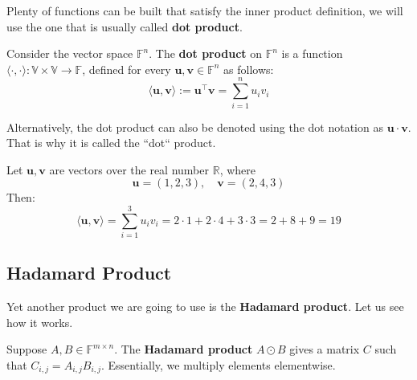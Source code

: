 \documentclass[../lecture-notes-148x210.tex]{subfiles}
\begin{document}
Plenty of functions can be built that satisfy the inner product definition, we will use the one that
is usually called \textbf{dot product}.
\begin{definition}
    Consider the vector space $\mathbb{F}^n$. The \textbf{dot product} on $\mathbb{F}^n$ is a function $\langle \cdot, \cdot \rangle: \mathbb{V} \times \mathbb{V} \rightarrow \mathbb{F}$, 
    defined for every $\mathbf{u}, \mathbf{v} \in \mathbb{F}^n$ as follows:
    \begin{equation*}
        \langle \mathbf{u}, \mathbf{v} \rangle := \mathbf{u}^{\top}\mathbf{v} = \sum_{i=1}^{n} u_i v_i
    \end{equation*}

    Alternatively, the dot product can also be denoted using the dot notation as $\mathbf{u} \cdot \mathbf{v}$. That is why it is called the ``dot`` product.
\end{definition}

\begin{example}
    Let $\mathbf{u}, \mathbf{v}$ are vectors over the real number $\mathbb{R}$, where
    \begin{equation*}
        \mathbf{u} = (1, 2, 3), \quad \mathbf{v} = (2, 4, 3)
    \end{equation*}
    Then: 
    \begin{equation*}
        \langle \mathbf{u}, \mathbf{v}\rangle = \sum_{i=1}^{3}u_iv_i = 2 \cdot 1 + 2 \cdot 4 + 3 \cdot 3 = 2 + 8 + 9 = 19
    \end{equation*}
\end{example}

\subsection{Hadamard Product}

Yet another product we are going to use is the \textbf{Hadamard product}. Let us see how it works.
\begin{definition}
    Suppose $A,B \in \mathbb{F}^{m \times n}$. The \textbf{Hadamard product} $A \odot B$ gives a matrix $C$ such that $C_{i,j} = A_{i,j}B_{i,j}$. Essentially, we multiply elements elementwise.
\end{definition}
\end{document}
